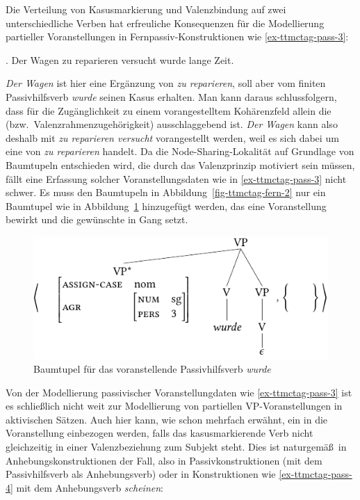 Die Verteilung von Kasusmarkierung und Valenzbindung auf zwei unterschiedliche Verben hat erfreuliche Konsequenzen für die Modellierung partieller Voranstellungen in Fernpassiv-Konstruktionen wie \ref{ex-ttmctag-pass-3}:


\ex. \label{ex-ttmctag-pass-3} Der Wagen zu reparieren versucht wurde lange Zeit. \hfill \citep[(316-b)]{Meurers:99}

{\it Der Wagen} ist hier eine Ergänzung von {\it zu reparieren}, soll aber vom finiten Passivhilfsverb {\it wurde} seinen Kasus erhalten. Man kann daraus schlussfolgern, dass  für die Zugänglichkeit zu einem vorangestelltem Kohärenzfeld allein die  (bzw.\ Valenzrahmenzugehörigkeit) ausschlaggebend ist.  {\it Der Wagen} kann also deshalb mit {\it zu reparieren versucht} vorangestellt werden, weil es sich dabei um eine  von {\it zu reparieren} handelt. Da die Node-Sharing-Lokalität auf Grundlage von Baumtupeln entschieden wird, die durch das Valenzprinzip motiviert sein müssen, fällt eine Erfassung solcher Voranstellungsdaten wie in \ref{ex-ttmctag-pass-3} nicht schwer. Es muss den Baumtupeln in Abbildung~\ref{fig-ttmctag-fern-2} nur ein Baumtupel wie in Abbildung~\ref{fig-ttmctag-fern-3} hinzugefügt werden, das eine Voranstellung bewirkt und die gewünschte  in Gang setzt. 
\begin{figure}[t]
\centering
\includegraphics{graphics/abb724.pdf}
\caption{\label{fig-ttmctag-fern-3}Baumtupel für das voranstellende Passivhilfsverb {\it wurde}}
\end{figure}

Von der Modellierung passivischer Voranstellungdaten wie \ref{ex-ttmctag-pass-3} ist es schlie\ss lich nicht weit zur Modellierung von partiellen VP-Voranstellungen in aktivischen Sätzen. Auch hier kann, wie schon mehrfach erwähnt, ein  in die Voranstellung einbezogen werden, falls das kasusmarkierende Verb nicht gleichzeitig in einer Valenzbeziehung zum Subjekt steht. Dies ist naturgemä\ss\ in Anhebungskonstruktionen der Fall, also in Passivkonstruktionen (mit dem Passivhilfsverb als Anhebungsverb) oder in Konstruktionen wie \ref{ex-ttmctag-pass-4} mit dem Anhebungsverb {\it scheinen}:  

